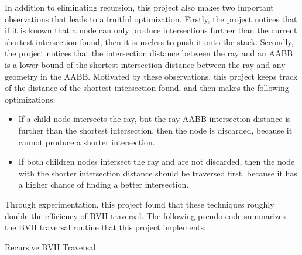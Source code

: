 In addition to eliminating recursion, this project also makes two important observations that leads to a fruitful optimization. Firstly, the project notices that if it is known that a node can only produce intersections further than the current shortest intersection found, then it is useless to push it onto the stack. Secondly, the project notices that the intersection distance between the ray and an AABB is a lower-bound of the shortest intersection distance between the ray and any geometry in the AABB. Motivated by these observations, this project keeps track of the distance of the shortest intersection found, and then makes the following optimizations:
\begin{itemize}
    \item If a child node intersects the ray, but the ray-AABB intersection distance is further than the shortest intersection, then the node is discarded, because it cannot produce a shorter intersection.
    \item If both children nodes intersect the ray and are not discarded, then the node with the shorter intersection distance should be traversed first, because it has a higher chance of finding a better intersection.
\end{itemize}
Through experimentation, this project found that these techniques roughly double the efficiency of BVH traversal. The following pseudo-code summarizes the BVH traversal routine that this project implements:

\begin{algorithm}[H]
    \label{algo bvh traversal}
    \caption{Recursive BVH Traversal}
\end{algorithm} 

